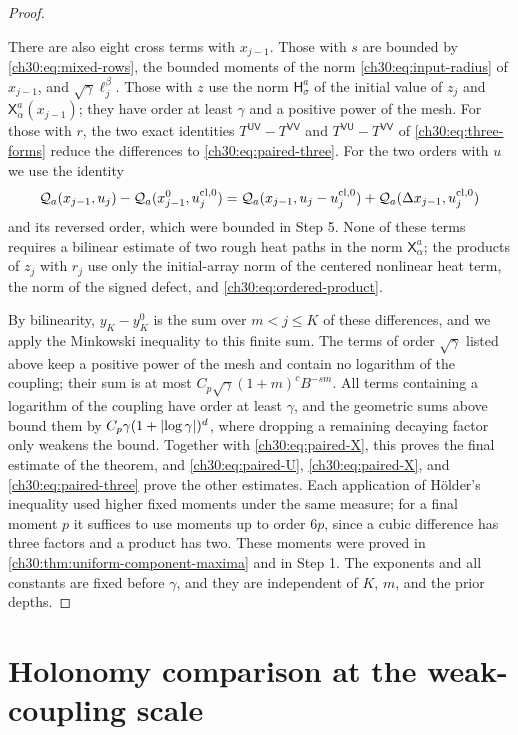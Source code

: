 \begin{proof}
\begin{itemize}
\end{itemize}
There are also eight cross terms with $x_{j-1}$. Those with $s$ are bounded by \eqref{ch30:eq:mixed-rows}, the bounded moments of the norm \eqref{ch30:eq:input-radius} of $x_{j-1}$, and $\sqrt\gamma\ell_j^\beta$. Those with $z$ use the norm $\mathsf H_\sigma^a$ of the initial value of $z_j$ and $\mathsf X_\alpha^a(x_{j-1})$; they have order at least $\gamma$ and a positive power of the mesh. For those with $r$, the two exact identities $T^{\mathsf{UV}}-T^{\mathsf{VV}}$ and $T^{\mathsf{VU}}-T^{\mathsf{VV}}$ of \eqref{ch30:eq:three-forms} reduce the differences to \eqref{ch30:eq:paired-three}. For the two orders with $u$ we use the identity
\[
 \mathcal Q_{a}(x_{j-1},u_j)-\mathcal Q_{a}(x_{j-1}^0,u_j^{\mathrm{cl},0})=\mathcal Q_{a}(x_{j-1},u_j-u_j^{\mathrm{cl},0})+\mathcal Q_{a}(\Delta x_{j-1},u_j^{\mathrm{cl},0})
\]
and its reversed order, which were bounded in Step 5. None of these terms requires a bilinear estimate of two rough heat paths in the norm $\mathsf X_\alpha^a$; the products of $z_j$ with $r_j$ use only the initial-array norm of the centered nonlinear heat term, the norm of the signed defect, and \eqref{ch30:eq:ordered-product}.

By bilinearity, $y_K-y_K^0$ is the sum over $m<j\le K$ of these differences, and we apply the Minkowski inequality to this finite sum. The terms of order $\sqrt\gamma$ listed above keep a positive power of the mesh and contain no logarithm of the coupling; their sum is at most $C_p\sqrt\gamma(1+m)^cB^{-sm}$. All terms containing a logarithm of the coupling have order at least $\gamma$, and the geometric sums above bound them by $C_p\gamma(1+\lvert \log\gamma\rvert)^d$, where dropping a remaining decaying factor only weakens the bound. Together with \eqref{ch30:eq:paired-X}, this proves the final estimate of the theorem, and \eqref{ch30:eq:paired-U}, \eqref{ch30:eq:paired-X}, and \eqref{ch30:eq:paired-three} prove the other estimates. Each application of H\"older's inequality used higher fixed moments under the same measure; for a final moment $p$ it suffices to use moments up to order $6p$, since a cubic difference has three factors and a product has two. These moments were proved in \cref{ch30:thm:uniform-component-maxima} and in Step 1. The exponents and all constants are fixed before $\gamma$, and they are independent of $K$, $m$, and the prior depths.
\end{proof}

\section{Holonomy comparison at the weak-coupling scale}\label{ch30:sec:transport}

